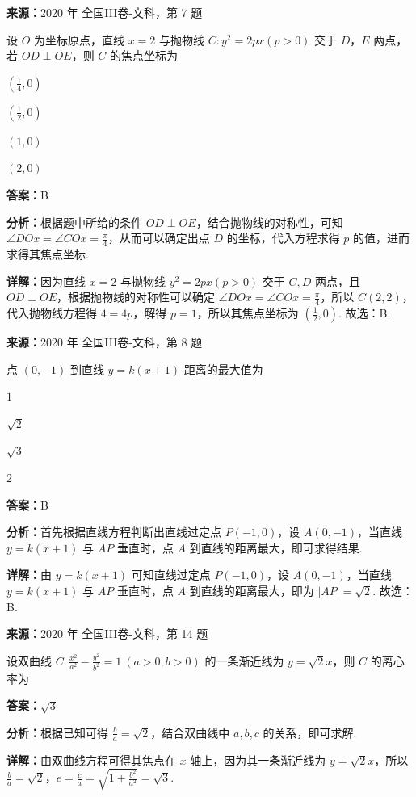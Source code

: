 \begin{question}[points=5]
\textbf{来源：}2020 年 全国III卷-文科，第 7 题\par
设 $O$ 为坐标原点，直线 $x=2$ 与抛物线 $C:y^2=2px(p>0)$ 交于 $D$，$E$ 两点，若 $OD\perp OE$，则 $C$ 的焦点坐标为
\begin{choices}
  \item $(\frac{1}{4},0)$
  \item $(\frac{1}{2},0)$
  \item $(1,0)$
  \item $(2,0)$
\end{choices}
\begin{solution}
\textbf{答案：}B

\textbf{分析：}根据题中所给的条件 $OD\perp OE$，结合抛物线的对称性，可知 $\angle DOx=\angle COx=\frac{\pi}{4}$，从而可以确定出点 $D$ 的坐标，代入方程求得 $p$ 的值，进而求得其焦点坐标.

\textbf{详解：}因为直线 $x=2$ 与抛物线 $y^2=2px(p>0)$ 交于 $C,D$ 两点，且 $OD\perp OE$，根据抛物线的对称性可以确定 $\angle DOx=\angle COx=\frac{\pi}{4}$，所以 $C(2,2)$，代入抛物线方程得 $4=4p$，解得 $p=1$，所以其焦点坐标为 $(\frac{1}{2},0)$. 故选：B.
\end{solution}
\end{question}

\begin{question}[points=5]
\textbf{来源：}2020 年 全国III卷-文科，第 8 题\par
点 $(0,-1)$ 到直线 $y=k(x+1)$ 距离的最大值为
\begin{choices}
  \item $1$
  \item $\sqrt{2}$
  \item $\sqrt{3}$
  \item $2$
\end{choices}
\begin{solution}
\textbf{答案：}B

\textbf{分析：}首先根据直线方程判断出直线过定点 $P(-1,0)$，设 $A(0,-1)$，当直线 $y=k(x+1)$ 与 $AP$ 垂直时，点 $A$ 到直线的距离最大，即可求得结果.

\textbf{详解：}由 $y=k(x+1)$ 可知直线过定点 $P(-1,0)$，设 $A(0,-1)$，当直线 $y=k(x+1)$ 与 $AP$ 垂直时，点 $A$ 到直线的距离最大，即为 $|AP|=\sqrt{2}$. 故选：B.
\end{solution}
\end{question}

\begin{question}[points=5]
\textbf{来源：}2020 年 全国III卷-文科，第 14 题\par
设双曲线 $C:\frac{x^2}{a^2}-\frac{y^2}{b^2}=1\ (a>0,b>0)$ 的一条渐近线为 $y=\sqrt{2}x$，则 $C$ 的离心率为
\fillin[{$\sqrt{3}$}]
\begin{solution}
\textbf{答案：}$\sqrt{3}$

\textbf{分析：}根据已知可得 $\frac{b}{a}=\sqrt{2}$，结合双曲线中 $a,b,c$ 的关系，即可求解.

\textbf{详解：}由双曲线方程可得其焦点在 $x$ 轴上，因为其一条渐近线为 $y=\sqrt{2}x$，所以 $\frac{b}{a}=\sqrt{2}$，$e=\frac{c}{a}=\sqrt{1+\frac{b^2}{a^2}}=\sqrt{3}$.
\end{solution}
\end{question}

